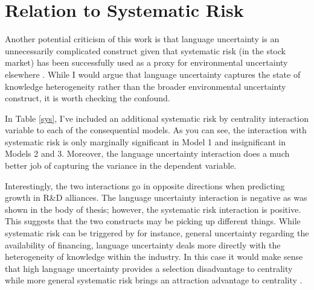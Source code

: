 \section{Relation to Systematic Risk}
Another potential criticism of this work is that language uncertainty is an unnecessarily complicated construct given that systematic risk (in the stock market) has been successfully used as a proxy for environmental uncertainty elsewhere \citep[see e.g.][]{lavie2007}. While I would argue that language uncertainty captures the state of knowledge heterogeneity rather than the broader environmental uncertainty construct, it is worth checking the confound. 

In Table \ref{sys}, I've included an additional systematic risk by centrality interaction variable to each of the consequential models. As you can see, the interaction with systematic risk is only marginally significant in Model 1 and insignificant in Models 2 and 3. Moreover, the language uncertainty interaction does a much better job of capturing the variance in the dependent variable. 

Interestingly, the two interactions go in opposite directions when predicting growth in R\&D alliances. The language uncertainty interaction is negative as was shown in the body of thesis; however, the systematic risk interaction is positive. This suggests that the two constructs may be picking up different things. While systematic risk can be triggered by for instance, general uncertainty regarding the availability of financing, language uncertainty deals more directly with the heterogeneity of knowledge within the industry. In this case it would make sense that high language uncertainty provides a selection disadvantage to centrality while more general systematic risk brings an attraction advantage to centrality \citep[e.g.][]{podolny1994}. 

